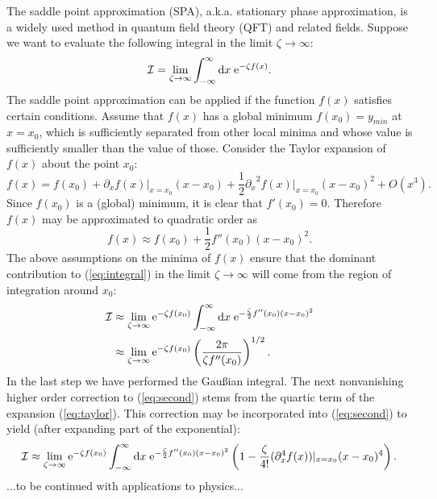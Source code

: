 \documentclass[12pt]{article}
\begin{document}
The saddle point approximation (SPA), a.k.a. stationary phase approximation, is a widely used method in quantum field theory (QFT) and related fields. 
Suppose we want to evaluate the following integral in the limit $\zeta \rightarrow \infty$:
\begin{equation}\label{eq:integral}
{\mathcal I} = \lim_{\zeta \rightarrow \infty} \int_{-\infty}^{\infty} {\mbox d}x
\; {\mbox e}^{- \zeta f(x)}.
\end{equation}
The saddle point approximation can be applied if the function $f(x)$ satisfies certain conditions. Assume that $f(x)$ has a global minimum $f(x_0)=y_{min}$ at $x=x_0$, which is sufficiently separated from other local minima and whose value is sufficiently smaller than the value of those.
Consider the Taylor expansion of $f(x)$ about the point $x_0$:
\begin{equation}\label{eq:taylor}
f(x) = f(x_0) + \partial_x f(x){\Big |}_{x=x_0}(x-x_0) + \frac{1}{2} {\partial_x}^2 f(x){\Big |}_{x=x_0}(x-x_0)^2 + O(x^3).
\end{equation}
Since $f(x_0)$ is a (global) minimum, it is clear that $f'(x_0)=0$. Therefore $f(x)$ may be approximated to quadratic order as 
\begin{equation}
f(x) \approx f(x_0) + \frac{1}{2} f''(x_0) (x-x_0)^2.
\end{equation}
The above assumptions on the minima of $f(x)$ ensure that the dominant contribution to (\ref{eq:integral}) in the limit $\zeta \rightarrow \infty$ will 
come from the region of integration around $x_0$:
\begin{align}\label{eq:second}
{\mathcal I} &\approx \lim_{\zeta \rightarrow \infty} {\mbox e}^{-\zeta f(x_0)} \int_{-\infty}^{\infty} {\mbox d}x \; {\mbox e}^{-\frac{\zeta}{2} f''(x_0)(x-x_0)^2} \\ \nonumber
&\approx \lim_{\zeta \rightarrow \infty} {\mbox e}^{-\zeta f(x_0)} \left( \frac{2 \pi}{\zeta f''(x_0)}\right)^{1/2}.
\end{align}
In the last step we have performed the Gau{\ss}ian integral. 
The next nonvanishing higher order correction to (\ref{eq:second}) stems from the quartic term of the expansion (\ref{eq:taylor}). This correction may be incorporated into (\ref{eq:second}) to yield (after expanding part of the exponential):
\begin{equation}
{\mathcal I} \approx \lim_{\zeta \rightarrow \infty} {\mbox e}^{-\zeta f(x_0)} \int_{-\infty}^{\infty} {\mbox d}x \; {\mbox e}^{-\frac{\zeta}{2} f''(x_0)(x-x_0)^2} \left( 1 - \frac{\zeta}{4!} (\partial_x^4 f(x))|_{x=x_0}(x-x_0)^4 \right).
\end{equation}
...to be continued with applications to physics...
\end{document}
